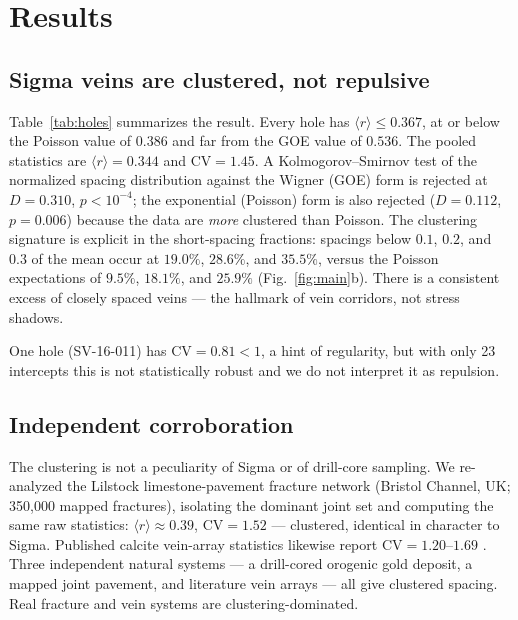 \documentclass[11pt]{article}
\begin{document}
\section{Results}

\subsection{Sigma veins are clustered, not repulsive}
Table~\ref{tab:holes} summarizes the result. Every hole has
$\langle r\rangle \le 0.367$, at or below the Poisson value of $0.386$ and far
from the GOE value of $0.536$. The pooled statistics are
$\langle r\rangle=0.344$ and $\mathrm{CV}=1.45$. A Kolmogorov--Smirnov test of
the normalized spacing distribution against the Wigner (GOE) form is rejected at
$D=0.310$, $p<10^{-4}$; the exponential (Poisson) form is also rejected
($D=0.112$, $p=0.006$) because the data are \emph{more} clustered than Poisson.
The clustering signature is explicit in the short-spacing fractions: spacings
below $0.1$, $0.2$, and $0.3$ of the mean occur at $19.0\%$, $28.6\%$, and
$35.5\%$, versus the Poisson expectations of $9.5\%$, $18.1\%$, and $25.9\%$
(Fig.~\ref{fig:main}b). There is a consistent excess of closely spaced veins ---
the hallmark of vein corridors, not stress shadows.

One hole (SV-16-011) has $\mathrm{CV}=0.81<1$, a hint of regularity, but with
only 23 intercepts this is not statistically robust and we do not interpret it
as repulsion.

\subsection{Independent corroboration}
The clustering is not a peculiarity of Sigma or of drill-core sampling. We
re-analyzed the Lilstock limestone-pavement fracture network (Bristol Channel,
UK; 350{,}000 mapped fractures), isolating the dominant joint set and computing
the same raw statistics: $\langle r\rangle\approx0.39$, $\mathrm{CV}=1.52$ ---
clustered, identical in character to Sigma. Published calcite vein-array
statistics likewise report $\mathrm{CV}=1.20$--$1.69$ \citep{casoli2026}. Three
independent natural systems --- a drill-cored orogenic gold deposit, a mapped
joint pavement, and literature vein arrays --- all give clustered spacing. Real
fracture and vein systems are clustering-dominated.
\end{document}
